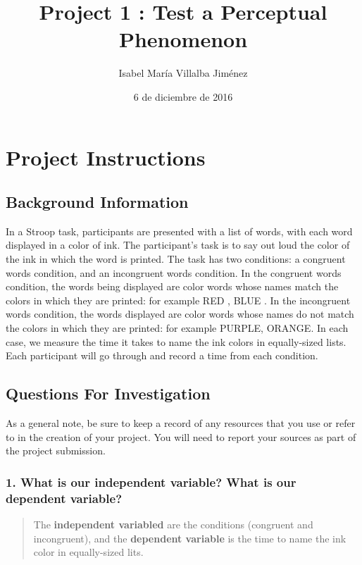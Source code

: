 \documentclass[]{article}
\title{Project 1 : Test a Perceptual Phenomenon}
\author{Isabel María Villalba Jiménez}
\date{6 de diciembre de 2016}
\begin{document}
\maketitle

\section{Project Instructions}\label{project-instructions}

\subsection{Background Information}\label{background-information}

In a Stroop task, participants are presented with a list of words, with
each word displayed in a color of ink. The participant's task is to say
out loud the color of the ink in which the word is printed. The task has
two conditions: a congruent words condition, and an incongruent words
condition. In the congruent words condition, the words being displayed
are color words whose names match the colors in which they are printed:
for example {RED }, {BLUE }. In the incongruent words condition, the
words displayed are color words whose names do not match the colors in
which they are printed: for example {PURPLE}, { ORANGE}. In each case,
we measure the time it takes to name the ink colors in equally-sized
lists. Each participant will go through and record a time from each
condition.

\subsection{Questions For
Investigation}\label{questions-for-investigation}

As a general note, be sure to keep a record of any resources that you
use or refer to in the creation of your project. You will need to report
your sources as part of the project submission.

\subsubsection{1. What is our independent variable? What is our
dependent
variable?}\label{what-is-our-independent-variable-what-is-our-dependent-variable}

\begin{quote}
The \textbf{independent variabled} are the conditions (congruent and
incongruent), and the \textbf{dependent variable} is the time to name
the ink color in equally-sized lits.
\end{quote}
\end{document}
